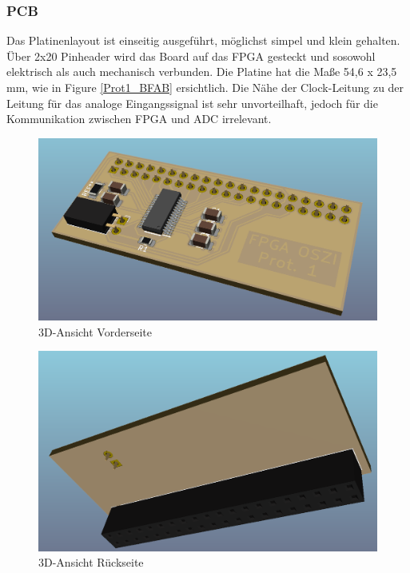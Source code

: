 \subsubsection{PCB}
Das Platinenlayout ist einseitig ausgeführt, möglichst simpel und klein gehalten. Über 2x20 Pinheader wird das Board auf das FPGA gesteckt und sosowohl elektrisch als auch mechanisch verbunden. Die Platine hat die Maße 54,6 x 23,5 mm, wie in Figure \ref{Prot1_BFAB} ersichtlich. Die Nähe der Clock-Leitung zu der Leitung für das analoge Eingangssignal ist sehr unvorteilhaft, jedoch für die Kommunikation zwischen FPGA und ADC irrelevant.
\begin{figure}[h!]
\begin{center}
\includegraphics[width = 15cm]{SAUER/Grafiken/Prot1/3DF.png}
\caption{3D-Ansicht Vorderseite}
\end{center}
\end{figure}
\begin{figure}[h!]
\begin{center}
\includegraphics[width = 15cm]{SAUER/Grafiken/Prot1/3DB.png}
\caption{3D-Ansicht Rückseite}
\end{center}
\end{figure}
